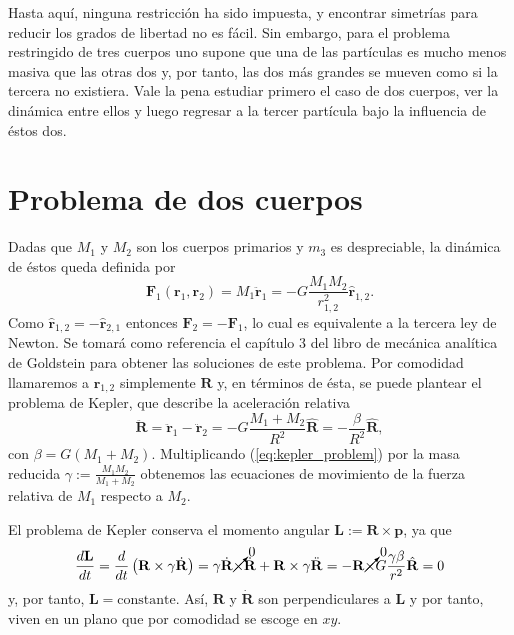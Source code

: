 Hasta aquí, ninguna restricción ha sido impuesta, y encontrar simetrías para reducir los grados de libertad no es fácil. Sin embargo, para el problema restringido de tres cuerpos uno supone que una de las partículas es mucho menos masiva que las otras dos y, por tanto, las dos más grandes se mueven como si la tercera no existiera. Vale la pena estudiar primero el caso de dos cuerpos, ver la dinámica entre ellos y luego regresar a la tercer partícula bajo la influencia de éstos dos. 

\section{Problema de dos cuerpos}
\label{sec:2body_problem}
Dadas que $M_1$ y $M_2$ son los cuerpos primarios y $m_3$ es despreciable, la dinámica de éstos queda definida por
\begin{equation}
 \mathbf{F}_1(\mathbf{r}_1,\mathbf{r}_2) = M_1 \ddot{\mathbf{r}}_1 = -G \frac{M_1 M_2}{r_{1,2}^2} \hat{\mathbf{r}}_{1,2}.
 \label{eq:2body_eqs_motion}
\end{equation}
Como $\hat{\mathbf{r}}_{1,2} = - \hat{\mathbf{r}}_{2,1}$ entonces $\mathbf{F}_2 = -\mathbf{F}_1$, lo cual es equivalente a la tercera ley de Newton. Se tomará como referencia el capítulo 3 del libro de mecánica analítica de Goldstein \cite{Goldstein2007} para obtener las soluciones de este problema. Por comodidad llamaremos a $\mathbf{r}_{1,2}$ simplemente $\mathbf{R}$ y, en términos de ésta, se puede plantear el problema de Kepler, que describe la aceleración relativa
\begin{equation}
 \ddot{\mathbf{R}} = \ddot{\mathbf{r}}_1 - \ddot{\mathbf{r}}_2 = -G \frac{M_1 + M_2}{R^2} \hat{\mathbf{R}} = - \frac{\beta}{R^2}\hat{\mathbf{R}},
 \label{eq:kepler_problem}
\end{equation}
con $\beta = G \left(M_1 + M_2 \right)$. Multiplicando (\ref{eq:kepler_problem}) por la masa reducida $\gamma := \frac{M_1 M_2}{M_1+M_2}$ obtenemos las ecuaciones de movimiento de la fuerza relativa de $M_1$ respecto a $M_2$.

El problema de Kepler conserva el momento angular $\mathbf{L} := \mathbf{R} \times \mathbf{p}$, ya que
\begin{equation}
 \frac{d\mathbf{L}}{dt} = \frac{d}{dt}\left(\mathbf{R} \times \gamma\dot{\mathbf{R}} \right) = \gamma\dot{\mathbf{R}} \cancelto{0}{\times}\dot{\mathbf{R}} + \mathbf{R} \times \gamma \ddot{\mathbf{R}} = - \mathbf{R} \cancelto{0}{\times} G\frac{\gamma \beta}{r^2}\hat{\mathbf{R}} = 0
\end{equation}
y, por tanto, $\mathbf{L} = \text{constante}$. Así, $\mathbf{R}$ y $\dot{\mathbf{R}}$ son perpendiculares a $\mathbf{L}$ y por tanto, viven en un plano que por comodidad se escoge en $xy$. 

